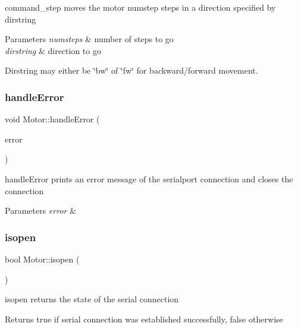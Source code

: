 command\+\_\+step moves the motor numstep steps in a direction specified by dirstring 


\begin{DoxyParams}{Parameters}
{\em numsteps} & number of steps to go \\
\hline
{\em dirstring} & direction to go\\
\hline
\end{DoxyParams}
Dirstring may either be \char`\"{}bw\char`\"{} of \char`\"{}fw\char`\"{} for backward/forward movement. \mbox{\label{classMotor_a4c95080f6faf87f02844093e948d485a}} 
\subsubsection{\texorpdfstring{handle\+Error}{handleError}}
{\footnotesize\ttfamily void Motor\+::handle\+Error (\begin{DoxyParamCaption}\item[{Q\+Serial\+Port\+::\+Serial\+Port\+Error}]{error }\end{DoxyParamCaption})\hspace{0.3cm}{\ttfamily [slot]}}



handle\+Error prints an error message of the serialport connection and closes the connection 


\begin{DoxyParams}{Parameters}
{\em error} & \\
\hline
\end{DoxyParams}
\mbox{\label{classMotor_a6522462ca0730300ca3335090425786b}} 
\subsubsection{\texorpdfstring{isopen}{isopen}}
{\footnotesize\ttfamily bool Motor\+::isopen (\begin{DoxyParamCaption}{ }\end{DoxyParamCaption})\hspace{0.3cm}{\ttfamily [slot]}}



isopen returns the state of the serial connection 

\begin{DoxyReturn}{Returns}
true if serial connection was established successfully, false otherwise 
\end{DoxyReturn}
\mbox{\label{classMotor_ad12a639c95a4a33f59118dc8145dc1d4}} 
